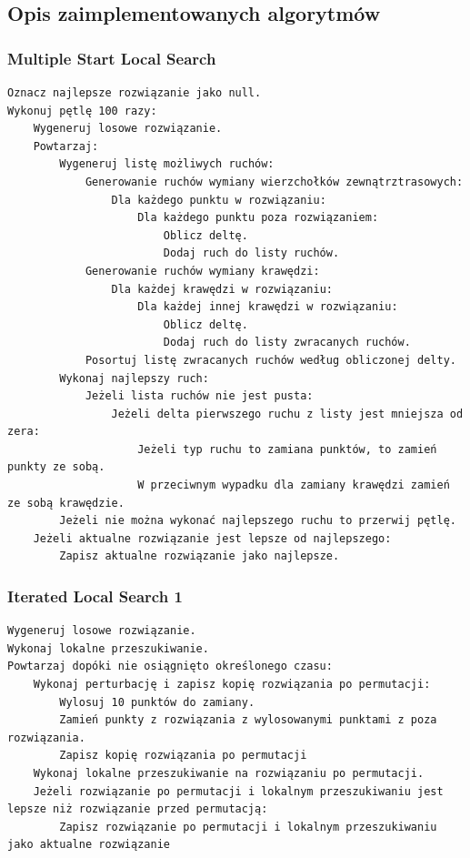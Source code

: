 \documentclass[a4paper]{article}
\begin{document}
\subsection{Opis zaimplementowanych algorytmów}

\subsubsection{Multiple Start Local Search}

\begin{lstlisting}
Oznacz najlepsze rozwiązanie jako null.
Wykonuj pętlę 100 razy:
    Wygeneruj losowe rozwiązanie.
    Powtarzaj:
        Wygeneruj listę możliwych ruchów:
            Generowanie ruchów wymiany wierzchołków zewnątrztrasowych:
                Dla każdego punktu w rozwiązaniu:
                    Dla każdego punktu poza rozwiązaniem:
                        Oblicz deltę.
                        Dodaj ruch do listy ruchów.
            Generowanie ruchów wymiany krawędzi:
                Dla każdej krawędzi w rozwiązaniu:
                    Dla każdej innej krawędzi w rozwiązaniu:
                        Oblicz deltę.
                        Dodaj ruch do listy zwracanych ruchów.
            Posortuj listę zwracanych ruchów według obliczonej delty.
        Wykonaj najlepszy ruch:
            Jeżeli lista ruchów nie jest pusta:
                Jeżeli delta pierwszego ruchu z listy jest mniejsza od zera:
                    Jeżeli typ ruchu to zamiana punktów, to zamień punkty ze sobą.
                    W przeciwnym wypadku dla zamiany krawędzi zamień ze sobą krawędzie.
        Jeżeli nie można wykonać najlepszego ruchu to przerwij pętlę.
    Jeżeli aktualne rozwiązanie jest lepsze od najlepszego:
    	Zapisz aktualne rozwiązanie jako najlepsze.
\end{lstlisting}

\subsubsection{Iterated Local Search 1}

\begin{lstlisting}
Wygeneruj losowe rozwiązanie.
Wykonaj lokalne przeszukiwanie.
Powtarzaj dopóki nie osiągnięto określonego czasu:
    Wykonaj perturbację i zapisz kopię rozwiązania po permutacji:
        Wylosuj 10 punktów do zamiany.
        Zamień punkty z rozwiązania z wylosowanymi punktami z poza rozwiązania.
        Zapisz kopię rozwiązania po permutacji
    Wykonaj lokalne przeszukiwanie na rozwiązaniu po permutacji.
    Jeżeli rozwiązanie po permutacji i lokalnym przeszukiwaniu jest lepsze niż rozwiązanie przed permutacją:
    	Zapisz rozwiązanie po permutacji i lokalnym przeszukiwaniu jako aktualne rozwiązanie
\end{lstlisting}
\end{document}
